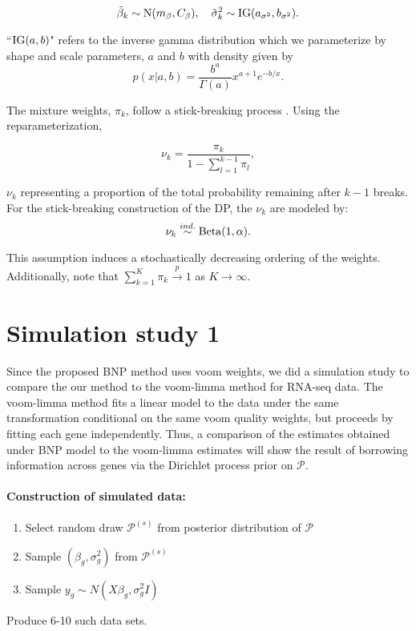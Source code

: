 \begin{equation}
\tilde{\beta}_k \sim \operatorname{N}(m_\beta, C_\beta),\quad \tilde{\sigma}^2_k \sim \operatorname{IG}(a_{\sigma^2}, b_{\sigma^2}).
\end{equation}

``$\operatorname{IG}(a,b)$" refers to the inverse gamma distribution which we parameterize by shape and scale parameters, $a$ and $b$ with density given by
\begin{equation*}
p(x|a,b) = \frac{b^a}{\Gamma(a)}x^{a+1}e^{-b/x}.
\end{equation*}


The mixture weights, $\pi_k$,  follow a stick-breaking process \cite{sethuraman}. Using the reparameterization,

\begin{equation}
\nu_k = \frac{\pi_k}{1 - \sum_{l=1}^{k-1} \pi_l},
\end{equation}

$\nu_k$ representing a proportion of the total probability remaining after $k-1$ breaks. For the stick-breaking construction of the DP, the $\nu_k$ are modeled by:
\begin{equation}
\nu_k \stackrel{ind.}{\sim} \operatorname{Beta}(1, \alpha).
\end{equation}

This assumption induces a stochastically decreasing ordering of the weights. Additionally, note that $\sum_{k=1}^K \pi_k \stackrel{p}{\rightarrow} 1$ as $K\rightarrow \infty$. 

\section{Simulation study 1}
Since the proposed BNP method uses voom weights, we did a simulation study to compare the our method to the voom-limma method for RNA-seq data. The voom-limma method fits a linear model to the data under the same transformation conditional on the same voom quality weights, but proceeds by fitting each gene independently. Thus, a comparison of the estimates obtained under BNP model to the voom-limma estimates will show the result of borrowing information across genes via the Dirichlet process prior on $\mathcal{P}$.

\paragraph{Construction of simulated data:}
\begin{enumerate}
\item Select random draw $\mathcal{P}^{(s)}$ from posterior distribution of $\mathcal{P}$

\item Sample $(\beta_g,\sigma^2_g)$ from $\mathcal{P}^{(s)}$

\item Sample $y_{g} \sim N(X\beta_g,\sigma^2_g I)$
\end{enumerate}
Produce 6-10 such data sets.\\

